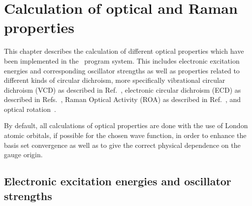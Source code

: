 \chapter{Calculation of optical and Raman properties}\label{ch:optchap}

This chapter describes the calculation of different optical properties
which have been implemented in the \dalton\ program system. This
includes electronic excitation energies and corresponding oscillator
strengths as well as properties related to different kinds of circular
dichroism, more specifically vibrational circular dichroism
(VCD) as described in
Ref.~\cite{klbpjthkrhjajjcp98}, electronic circular dichroism
(ECD) as described in
Refs.~\cite{klbaehkrthjopjtca90,tbpaehcpl246}, Raman Optical Activity
(ROA) as described in
Ref.~\cite{thkrklbpjjofd99}, and optical
rotation~\cite{plpmp91,plpdkckrcpl319}.

By default, all calculations of optical properties are done with the
use of London atomic orbitals, if possible for
the chosen wave function, in order to enhance the basis set convergence
as well as to give the correct physical dependence on the gauge
origin.


\section{Electronic excitation energies and oscillator strengths}\label{sec:uvvis}

\begin{center}
\end{center}

